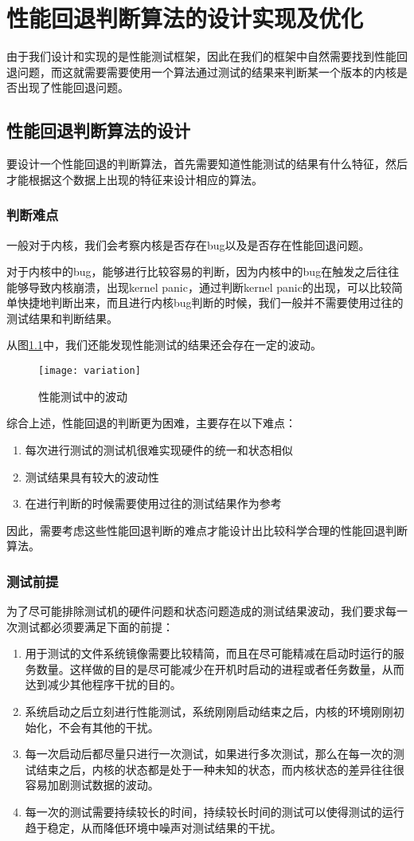 

\chapter{性能回退判断算法的设计实现及优化}
由于我们设计和实现的是性能测试框架，因此在我们的框架中自然需要找到性能回退问题，而这就需要需要使用一个算法通过测试的结果来判断某一个版本的内核是否出现了性能回退问题。


\section{性能回退判断算法的设计}
要设计一个性能回退的判断算法，首先需要知道性能测试的结果有什么特征，然后才能根据这个数据上出现的特征来设计相应的算法。

\subsection{判断难点}
一般对于内核，我们会考察内核是否存在bug以及是否存在性能回退问题。

对于内核中的bug，能够进行比较容易的判断，因为内核中的bug在触发之后往往能够导致内核崩溃，出现kernel panic，通过判断kernel panic的出现，可以比较简单快捷地判断出来，而且进行内核bug判断的时候，我们一般并不需要使用过往的测试结果和判断结果。

从图\ref{fig:variation}中，我们还能发现性能测试的结果还会存在一定的波动。
\begin{figure}[H]
\centering
\texttt{[image: variation]}
\caption{性能测试中的波动}
\label{fig:variation}
\end{figure}

综合上述，性能回退的判断更为困难，主要存在以下难点：
\begin{enumerate}
\item 每次进行测试的测试机很难实现硬件的统一和状态相似
\item 测试结果具有较大的波动性
\item 在进行判断的时候需要使用过往的测试结果作为参考
\end{enumerate}

因此，需要考虑这些性能回退判断的难点才能设计出比较科学合理的性能回退判断算法。
\subsection{测试前提}
为了尽可能排除测试机的硬件问题和状态问题造成的测试结果波动，我们要求每一次测试都必须要满足下面的前提：
\begin{enumerate}
\item 用于测试的文件系统镜像需要比较精简，而且在尽可能精减在启动时运行的服务数量。这样做的目的是尽可能减少在开机时启动的进程或者任务数量，从而达到减少其他程序干扰的目的。
\item 系统启动之后立刻进行性能测试，系统刚刚启动结束之后，内核的环境刚刚初始化，不会有其他的干扰。
\item 每一次启动后都尽量只进行一次测试，如果进行多次测试，那么在每一次的测试结束之后，内核的状态都是处于一种未知的状态，而内核状态的差异往往很容易加剧测试数据的波动。
\item 每一次的测试需要持续较长的时间，持续较长时间的测试可以使得测试的运行趋于稳定，从而降低环境中噪声对测试结果的干扰。
\end{enumerate}
